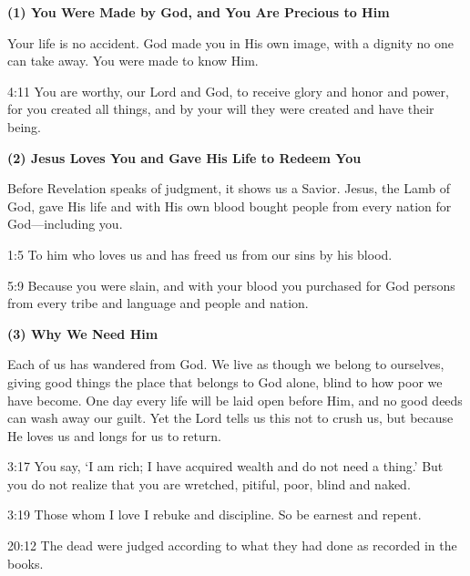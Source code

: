 \clearpage
{}
\begin{center}
\begin{tcolorbox}[
    width=0.95\textwidth,
    colback=white, %
    colframe=gray!70,
    colbacktitle=gray,
    coltitle=white,
    title={\small Did you know that Revelation holds the gospel for you?},
    halign title=center,
    fontupper=\small\setstretch{1.0},
    enhanced,
    boxrule=0.5pt,
    breakable,
    left=3pt,
    right=3pt,
    top=6pt,
    bottom=6pt
]

\textbf{(1) You Were Made by God, and You Are Precious to Him}

Your life is no accident. God made you in His own image, with a dignity no one can take away. You were made to know Him.
\begin{ScriptureBox}
\item[4:11] You are worthy, our Lord and God, to receive glory and honor and power, for you created all things, and by your will they were created and have their being.
\end{ScriptureBox}

\vspace{0.3cm}
\textbf{(2) Jesus Loves You and Gave His Life to Redeem You}

Before Revelation speaks of judgment, it shows us a Savior. Jesus, the Lamb of God, gave His life and with His own blood bought people from every nation for God---including you.
\begin{ScriptureBox}
\item[1:5] To him who loves us and has freed us from our sins by his blood.
\item[5:9] Because you were slain, and with your blood you purchased for God persons from every tribe and language and people and nation.
\end{ScriptureBox}

\vspace{0.3cm}
\textbf{(3) Why We Need Him}

Each of us has wandered from God. We live as though we belong to ourselves, giving good things the place that belongs to God alone, blind to how poor we have become. One day every life will be laid open before Him, and no good deeds can wash away our guilt. Yet the Lord tells us this not to crush us, but because He loves us and longs for us to return.
\begin{ScriptureBox}
\item[3:17] You say, `I am rich; I have acquired wealth and do not need a thing.' But you do not realize that you are wretched, pitiful, poor, blind and naked.
\item[3:19] Those whom I love I rebuke and discipline. So be earnest and repent.
\item[20:12] The dead were judged according to what they had done as recorded in the books.
\end{ScriptureBox}


\end{tcolorbox}
\end{center}
